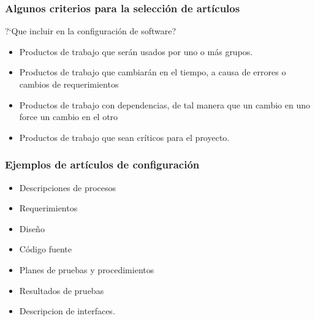 \begin{frame}
\frametitle{Algunos criterios para la selecci\'on de art\'iculos}
?`Que incluir en la configuraci\'on de software?
	\begin{itemize}
		\item Productos de trabajo que ser\'an usados por uno o m\'as grupos. 
		\item Productos de trabajo que cambiar\'an en el tiempo, a causa de errores o 
			cambios de requerimientos
		\item Productos de trabajo con dependencias, de tal manera que un cambio en uno 
			force un cambio en el otro
		\item Productos de trabajo que sean cr\'iticos para el proyecto. 
	\end{itemize}
\end{frame}
\begin{frame}
	\frametitle{Ejemplos de art\'iculos de configuraci\'on}
	\begin{itemize}
		\item Descripciones de procesos
		\item Requerimientos
		\item Dise\~no
		\item C\'odigo fuente
		\item Planes de pruebas y procedimientos
		\item Resultados de pruebas
		\item Descripcion de interfaces.
	\end{itemize}
\end{frame}

